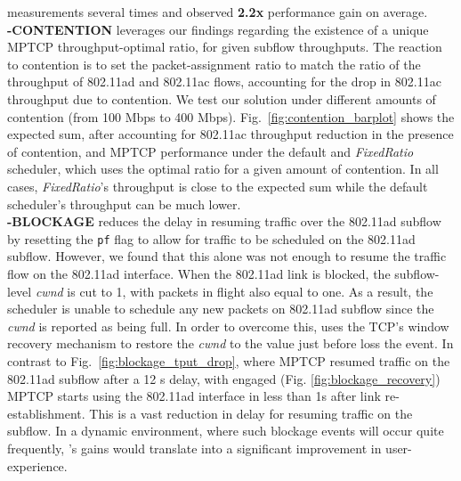 measurements several times and observed \textbf{2.2x} performance gain on average.
\\
\noindent\textbf{\name-CONTENTION} leverages our findings regarding the 
existence of a unique MPTCP throughput-optimal ratio, for given subflow
throughputs. The reaction to contention is to set
the packet-assignment ratio to match the ratio of the throughput of
802.11ad and 802.11ac flows, accounting for the drop in 802.11ac
throughput due to contention. We test our solution under different
amounts of contention (from 100 Mbps to 400
Mbps). Fig.~\ref{fig:contention_barplot} shows the expected sum, after
accounting for 802.11ac throughput reduction in the presence of
contention, and MPTCP performance under the default
and \emph{FixedRatio} scheduler, which uses the optimal ratio for a
given amount of contention. In all cases, \emph{FixedRatio}'s
throughput is close to the expected sum while the default scheduler's
throughput can be much lower.
\\
\noindent\textbf{\name-BLOCKAGE} reduces the delay in resuming traffic over the 802.11ad
subflow by resetting the {{\tt pf}} flag to allow for traffic to be
scheduled on the 802.11ad subflow. However, we found that this alone
was not enough to resume the traffic flow on the 802.11ad
interface. When the 802.11ad link is blocked, the
subflow-level \emph{cwnd} is cut to 1, with packets in flight also
equal to one. As a result, the scheduler is unable to schedule any new
packets on 802.11ad subflow since the \emph{cwnd} is reported as being
full. In order to overcome this, \name uses the TCP's window recovery
mechanism to restore the \emph{cwnd} to the value just before loss the
event. In contrast to Fig.~\ref{fig:blockage_tput_drop}, where MPTCP resumed traffic on the
802.11ad subflow after a 12 s delay, with \name engaged (Fig. \ref{fig:blockage_recovery}) 
MPTCP starts using the 802.11ad interface in less than 1s after link re-establishment. This
is a vast reduction in delay for resuming traffic on the subflow. In a
dynamic environment, where such blockage events will occur quite
frequently, \name's gains would translate into a significant
improvement in user-experience.

